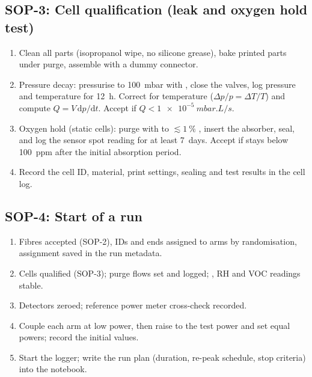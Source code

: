 \subsection*{SOP-3: Cell qualification (leak and oxygen hold test)}
\begin{enumerate}
  \item Clean all parts (isopropanol wipe, no silicone grease), bake printed parts under \Ntwo{} purge,
        assemble with a dummy connector.
  \item Pressure decay: pressurise to \SI{+100}{mbar} with \Ntwo, close the valves, log pressure and
        temperature for \SI{12}{h}. Correct for temperature ($\Delta p/p=\Delta T/T$) and compute
        $Q=V\,\mathrm{d}p/\mathrm{d}t$. Accept if $Q<\SI{1e-5}{mbar.L/s}$.
  \item Oxygen hold (static cells): purge with \Ntwo{} to $\lesssim\SI{1}{\percent}$ \Oxy, insert the
        absorber, seal, and log the \Oxy{} sensor spot reading for at least \SI{7}{days}. Accept if \Oxy{}
        stays below \SI{100}{ppm} after the initial absorption period.
  \item Record the cell ID, material, print settings, sealing and test results in the cell log.
\end{enumerate}

\subsection*{SOP-4: Start of a run}
\begin{enumerate}
  \item Fibres accepted (SOP-2), IDs and ends assigned to arms by randomisation, assignment saved in the
        run metadata.
  \item Cells qualified (SOP-3); purge flows set and logged; \Oxy, RH and VOC readings stable.
  \item Detectors zeroed; reference power meter cross-check recorded.
  \item Couple each arm at low power, then raise to the test power and set equal powers; record the
        initial values.
  \item Start the logger; write the run plan (duration, re-peak schedule, stop criteria) into the notebook.
\end{enumerate}

